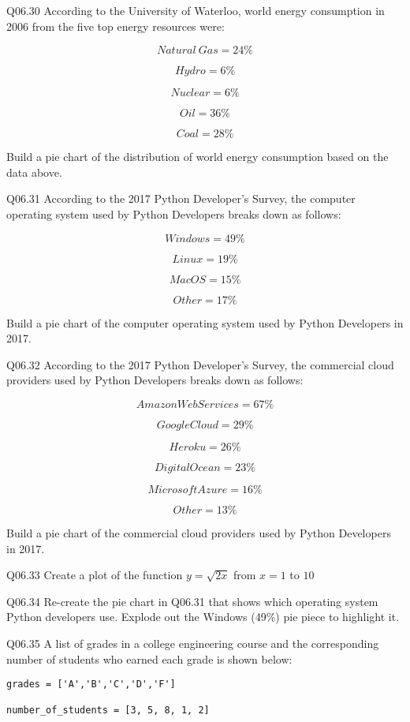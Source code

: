 \documentclass{book}
\newenvironment{problems}{}{}  %
\begin{document}
    
        \begin{problems}
        Q06.30 According to the University of Waterloo, world energy consumption
in 2006 from the five top energy resources were:

\[ Natural \ Gas = 24\% \]

\[ Hydro = 6\% \]

\[ Nuclear = 6\% \]

\[ Oil = 36\% \]

\[ Coal = 28\% \]

Build a pie chart of the distribution of world energy consumption based
on the data above.

Q06.31 According to the 2017 Python Developer's Survey, the computer
operating system used by Python Developers breaks down as follows:

\[ Windows = 49\% \]

\[ Linux = 19\% \]

\[ MacOS = 15\% \]

\[ Other = 17\% \]

Build a pie chart of the computer operating system used by Python
Developers in 2017.

Q06.32 According to the 2017 Python Developer's Survey, the commercial
cloud providers used by Python Developers breaks down as follows:

\[ Amazon Web Services = 67\% \]

\[ Google Cloud = 29\% \]

\[ Heroku = 26\% \]

\[ Digital Ocean = 23\% \]

\[ Microsoft Azure = 16\% \]

\[ Other = 13\% \]

Build a pie chart of the commercial cloud providers used by Python
Developers in 2017.

Q06.33 Create a plot of the function \(y=\sqrt{2x}\) from \(x = 1\) to
\(10\)

Q06.34 Re-create the pie chart in Q06.31 that shows which operating
system Python developers use. Explode out the Windows (49\%) pie piece
to highlight it.

Q06.35 A list of grades in a college engineering course and the
corresponding number of students who earned each grade is shown below:

\begin{lstlisting}
grades = ['A','B','C','D','F']

number_of_students = [3, 5, 8, 1, 2]
\end{lstlisting}


\end{problems}
\end{document}
